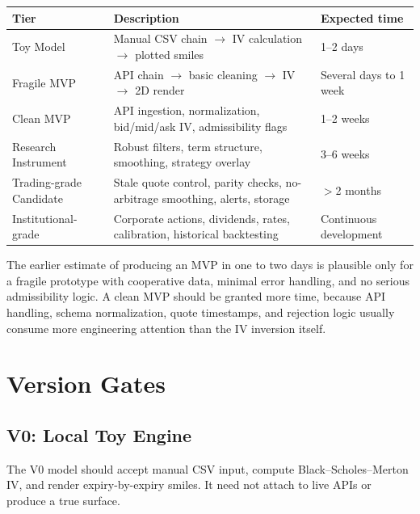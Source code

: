 \documentclass[11pt]{article}
\begin{document}
\begin{table}[htbp]
\centering
\small
\setlength{\tabcolsep}{4pt}
\renewcommand{\arraystretch}{1.15}
\begin{tabularx}{\textwidth}{@{}p{}Yp{0.19\textwidth}@{}}
\toprule
\textbf{Tier} & \textbf{Description} & \textbf{Expected time} \\
\midrule
Toy Model &
Manual CSV chain $\rightarrow$ IV calculation $\rightarrow$ plotted smiles &
1--2 days \\

Fragile MVP &
API chain $\rightarrow$ basic cleaning $\rightarrow$ IV $\rightarrow$ 2D render &
Several days to 1 week \\

Clean MVP &
API ingestion, normalization, bid/mid/ask IV, admissibility flags &
1--2 weeks \\

Research Instrument &
Robust filters, term structure, smoothing, strategy overlay &
3--6 weeks \\

Trading-grade Candidate &
Stale quote control, parity checks, no-arbitrage smoothing, alerts, storage &
$>$2 months \\

Institutional-grade &
Corporate actions, dividends, rates, calibration, historical backtesting &
Continuous development \\
\bottomrule
\end{tabularx}
\end{table}


The earlier estimate of producing an MVP in one to two days is plausible only for a fragile prototype with cooperative data, minimal error handling, and no serious admissibility logic. A clean MVP should be granted more time, because API handling, schema normalization, quote timestamps, and rejection logic usually consume more engineering attention than the IV inversion itself.

\section{Version Gates}

\subsection{V0: Local Toy Engine}

The V0 model should accept manual CSV input, compute Black--Scholes--Merton IV, and render expiry-by-expiry smiles. It need not attach to live APIs or produce a true surface.
\end{document}
